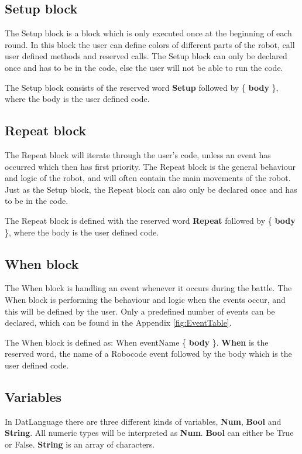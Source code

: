 \subsection{Setup block}
The Setup block is a block which is only executed once at the beginning of each round. In this block the user can define colors of different parts of the robot, call user defined methods and reserved calls. The Setup block can only be declared once and has to be in the code, else the user will not be able to run the code.

\begin{defi}
The Setup block consists of the reserved word \textbf{Setup} followed by \{ \textbf{body} \}, where the body is the user defined code. 
\end{defi}

\subsection{Repeat block}
The Repeat block will iterate through the user’s code, unless an event has occurred which then has first priority. The Repeat block is the general behaviour and logic of the robot, and will often contain the main movements of the robot. Just as the Setup block, the Repeat block can also only be declared once and has to be in the code.

\begin{defi}
The Repeat block is defined with the reserved word \textbf{Repeat} followed by \{ \textbf{body} \}, where the body is the user defined code.
\end{defi}

\subsection{When block}
The When block is handling an event whenever it occurs during the battle. The When block is performing the behaviour and logic when the events occur, and this will be defined by the user. Only a predefined number of events can be declared, which can be found in the Appendix \ref{fig:EventTable}.

\begin{defi}
The When block is defined as: When eventName \{ \textbf{body} \}. \textbf{When} is the reserved word, the name of a Robocode event followed by the body which is the user defined code.
\end{defi}

\subsection{Variables}
In DatLanguage there are three different kinds of variables, \textbf{Num}, \textbf{Bool} and \textbf{String}. All numeric types will be interpreted as \textbf{Num}. \textbf{Bool} can either be True or False. \textbf{String} is an array of characters.


